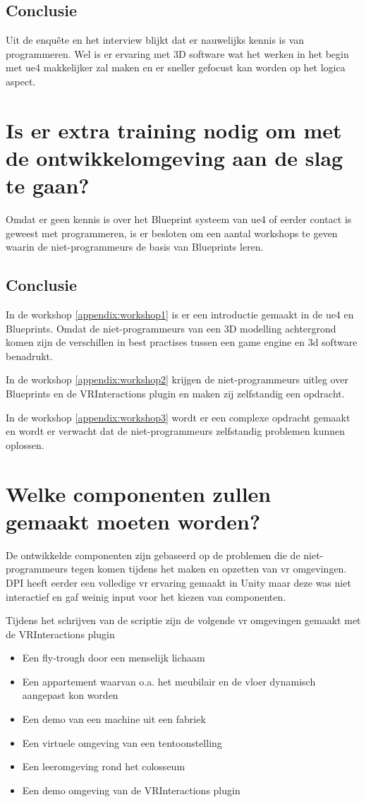 \subsection{Conclusie}
Uit de enquête en het interview blijkt dat er nauwelijks kennis is van programmeren. Wel is er ervaring met 3D software wat het werken in het begin met \gls{ue4} makkelijker zal maken en er sneller gefocust kan worden op het logica aspect.

\section{Is er extra training nodig om met de ontwikkelomgeving aan de slag te gaan?}
Omdat er geen kennis is over het Blueprint systeem van \gls{ue4} of eerder contact is geweest met programmeren, is er besloten om een aantal workshops te geven waarin de niet-programmeurs de basis van Blueprints leren.

\subsection{Conclusie}
In de workshop \ref{appendix:workshop1} is er een introductie gemaakt in de \gls{ue4} en Blueprints. Omdat de niet-programmeurs van een 3D modelling achtergrond komen zijn de verschillen in best practises tussen een game engine en 3d software benadrukt.

In de workshop \ref{appendix:workshop2} krijgen de niet-programmeurs uitleg over Blueprints en de VRInteractions plugin en maken zij zelfstandig een opdracht.

In de workshop \ref{appendix:workshop3} wordt er een complexe opdracht gemaakt en wordt er verwacht dat de niet-programmeurs zelfstandig problemen kunnen oplossen.

\section{Welke componenten zullen gemaakt moeten worden?}
\label{sec:welkeComponenten}
De ontwikkelde componenten zijn gebaseerd op de problemen die de niet-programmeurs tegen komen tijdens het maken en opzetten van \gls{vr} omgevingen. DPI heeft eerder een volledige \gls{vr} ervaring gemaakt in Unity maar deze was niet interactief en gaf weinig input voor het kiezen van componenten. 

Tijdens het schrijven van de scriptie zijn de volgende \gls{vr} omgevingen gemaakt met de VRInteractions plugin

\begin{itemize}
	\item Een fly-trough door een menselijk lichaam
	\item Een appartement waarvan o.a. het meubilair en de vloer dynamisch aangepast kon worden
	\item Een demo van een machine uit een fabriek
	\item Een virtuele omgeving van een tentoonstelling
	\item Een leeromgeving rond het colosseum
	\item Een demo omgeving van de VRInteractions plugin
\end{itemize}

